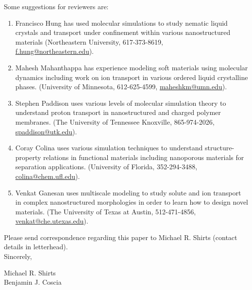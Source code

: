 \documentclass[fontsize=11pt]{article}
\begin{document}
	\noindent Some suggestions for reviewers are:
	\begin{enumerate}
	
		\item Francisco Hung has used molecular simulations to study nematic liquid crystals
		and transport under confinement within various nanostructured materials 
		(Northeastern University, 617-373-8619,\\ \href{mailto:f.hung@northeastern.edu}{f.hung@northeastern.edu}).
		
		\item Mahesh Mahanthappa has experience modeling soft materials using molecular dynamics
		including work on ion transport in various ordered liquid crystalline phases. 
		(University of Minnesota, 612-625-4599, \href{mailto:maheshkm@umn.edu}{maheshkm@umn.edu}).
		
		\item Stephen Paddison uses various levels of molecular simulation theory to understand
		proton transport in nanostructured and charged polymer membranes. (The University of Tennessee 
		Knoxville, 865-974-2026, \href{mailto:spaddison@utk.edu}{spaddison@utk.edu}).
		
		\item Coray Colina uses various simulation techniques to understand structure-property relations
		in functional materials including nanoporous materials for separation applications. (University
		of Florida, 352-294-3488, \href{mailto:colina@chem.ufl.edu}{colina@chem.ufl.edu}).
		
		\item Venkat Ganesan uses multiscale modeling to study solute and ion transport in complex
		nanostructured morphologies in order to learn how to design novel materials. (The University
		of Texas at Austin, 512-471-4856, \href{mailto:venkat@che.utexas.edu}{venkat@che.utexas.edu}).
		
		
	\end{enumerate}
	
	\noindent Please send correspondence regarding this paper to Michael R. Shirts (contact
	details in letterhead).\\	
	
	\noindent Sincerely,
	
	\noindent Michael R. Shirts \\
	\noindent Benjamin J. Coscia \\
	
\end{document}
